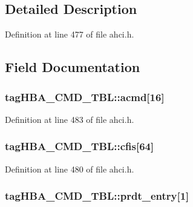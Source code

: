 \subsection{Detailed Description}


Definition at line 477 of file ahci.\+h.



\subsection{Field Documentation}
\subsubsection[{\texorpdfstring{acmd}{acmd}}]{ tag\+H\+B\+A\+\_\+\+C\+M\+D\+\_\+\+T\+B\+L\+::acmd\mbox{[}16\mbox{]}}\hypertarget{structtagHBA__CMD__TBL_a87421bf6801a2e75dd4d6e33c737857f}{}\label{structtagHBA__CMD__TBL_a87421bf6801a2e75dd4d6e33c737857f}


Definition at line 483 of file ahci.\+h.

\subsubsection[{\texorpdfstring{cfis}{cfis}}]{ tag\+H\+B\+A\+\_\+\+C\+M\+D\+\_\+\+T\+B\+L\+::cfis\mbox{[}64\mbox{]}}\hypertarget{structtagHBA__CMD__TBL_a3f54c56e56fb43a0c72e44f72717e53a}{}\label{structtagHBA__CMD__TBL_a3f54c56e56fb43a0c72e44f72717e53a}


Definition at line 480 of file ahci.\+h.

\subsubsection[{\texorpdfstring{prdt\+\_\+entry}{prdt_entry}}]{ tag\+H\+B\+A\+\_\+\+C\+M\+D\+\_\+\+T\+B\+L\+::prdt\+\_\+entry\mbox{[}1\mbox{]}}\hypertarget{structtagHBA__CMD__TBL_ac3a80d88e49b7bedf62d1a84217f1385}{}\label{structtagHBA__CMD__TBL_ac3a80d88e49b7bedf62d1a84217f1385}


